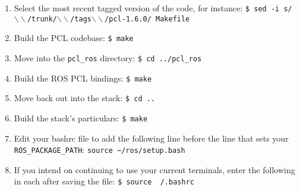 \documentclass[12pt]{report}
\begin{document}
\begin{sloppypar}
\begin{enumerate}
\item{Select the most recent tagged version of the code, for instance: \texttt{\$\ sed -i s/$\backslash\backslash$/trunk/$\backslash\backslash$/tags$\backslash\backslash$/pcl-1.6.0/ Makefile}}
\item{Build the PCL codebase: \texttt{\$\ make}}
\item{Move into the \texttt{pcl\_ros} directory: \texttt{\$\ cd ../pcl\_ros}}
\item{Build the ROS PCL bindings: \texttt{\$\ make}}
\item{Move back out into the stack: \texttt{\$\ cd ..}}
\item{Build the stack's particulars: \texttt{\$\ make}}
\item{Edit your bashrc file to add the following line before the line that sets your \texttt{ROS\_PACKAGE\_PATH}: \texttt{source \~{}/ros/setup.bash}}
\item{If you intend on continuing to use your current terminals, enter the following in each after saving the file: \texttt{\$\ source ~{}/.bashrc}}
\end{enumerate}
\end{sloppypar}
\end{document}
